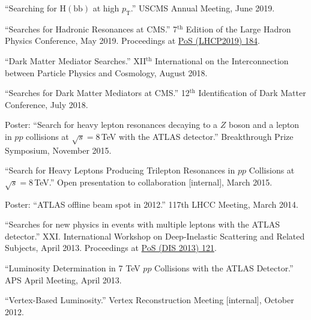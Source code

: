 \documentclass[12pt]{article} %
\begin{document}
``Searching for $\mathrm{H}(\mathrm{bb})$ at high $p_{\mathrm{T}}$.'' USCMS Annual Meeting, June 2019.

\smallskip

``Searches for Hadronic Resonances at CMS.'' 7$^{\mathrm{th}}$ Edition of the Large Hadron Physics Conference, May 2019. Proceedings at \href{https://doi.org/10.22323/1.350.0184}{PoS (LHCP2019) 184}.

\smallskip

``Dark Matter Mediator Searches.'' XII$^{\mathrm{th}}$ International on the Interconnection between Particle Physics and Cosmology, August 2018.

\smallskip

``Searches for Dark Matter Mediators at CMS.'' 12$^{\mathrm{th}}$ Identification of Dark Matter Conference, July 2018.

\smallskip

Poster: ``Search for heavy lepton resonances decaying to a $Z$ boson and a lepton in $pp$ collisions at $\sqrt{s}=8$\,TeV with the ATLAS detector.'' Breakthrough Prize Symposium, November 2015.

\smallskip

``Search for Heavy Leptons Producing Trilepton Resonances in $pp$ Collisions at $\sqrt{s}=8$\,TeV.'' Open presentation to collaboration [internal], March 2015.

\smallskip

Poster: ``ATLAS offline beam spot in 2012.'' 117th LHCC Meeting, March 2014.

\smallskip

``Searches for new physics in events with multiple leptons with the ATLAS detector.'' XXI. International Workshop on Deep-Inelastic Scattering and Related Subjects, April 2013. Proceedings at \href{https://doi.org/10.22323/1.191.0121}{PoS (DIS 2013) 121}.

\smallskip

``Luminosity Determination in 7 TeV $pp$ Collisions with the ATLAS Detector.'' APS April Meeting, April 2013.

\smallskip

``Vertex-Based Luminosity.'' Vertex Reconstruction Meeting [internal], October 2012.
\end{document}
